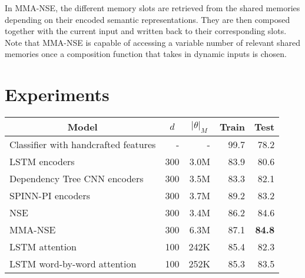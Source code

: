 \documentclass{article}
\begin{document}
In MMA-NSE, the different memory slots are retrieved from the shared memories depending on their encoded semantic representations. They are then composed together with the current input and written back to their corresponding slots. Note that MMA-NSE is capable of accessing a variable number of relevant shared memories once a composition function that takes in dynamic inputs is chosen.







\section{Experiments}

\begin{table*}[t]
\begin{center}
\small
\begin{tabular}{c|c|c|c|c}
\hline 
Model & $d$ & $|\theta|_M$ & Train	& Test \\
\hline
\multicolumn{1}{l|}{Classifier with handcrafted features \cite{bowman:15}} & \multicolumn{1}{|r|}{-} & \multicolumn{1}{|r|}{-} & \multicolumn{1}{|r|}{99.7} & \multicolumn{1}{|r}{78.2} \\
\hline
\multicolumn{1}{l|}{LSTM encoders \cite{bowman:15}} & \multicolumn{1}{|r|}{300} & \multicolumn{1}{|r|}{3.0M} & \multicolumn{1}{|r|}{83.9} & \multicolumn{1}{|r}{80.6} \\
\multicolumn{1}{l|}{Dependency Tree CNN encoders \cite{Lili16}} & \multicolumn{1}{|r|}{300} & \multicolumn{1}{|r|}{3.5M} & \multicolumn{1}{|r|}{83.3} & \multicolumn{1}{|r}{82.1} \\
\multicolumn{1}{l|}{SPINN-PI encoders \cite{BowmanGRGMP16}} & \multicolumn{1}{|r|}{300} & \multicolumn{1}{|r|}{3.7M} & \multicolumn{1}{|r|}{89.2} & \multicolumn{1}{|r}{83.2} \\
\multicolumn{1}{l|}{NSE} & \multicolumn{1}{|r|}{300} & \multicolumn{1}{|r|}{3.4M} & \multicolumn{1}{|r|}{86.2} & \multicolumn{1}{|r}{84.6} \\ \multicolumn{1}{l|}{MMA-NSE} & \multicolumn{1}{|r|}{300} & \multicolumn{1}{|r|}{6.3M} & \multicolumn{1}{|r|}{87.1} & \multicolumn{1}{|r}{\textbf{84.8}} \\ \hline
\multicolumn{1}{l|}{LSTM attention \cite{rocktaschel:16}} & \multicolumn{1}{|r|}{100} & \multicolumn{1}{|r|}{242K} & \multicolumn{1}{|r|}{85.4} & \multicolumn{1}{|r}{82.3} \\
\multicolumn{1}{l|}{LSTM word-by-word attention \cite{rocktaschel:16}} & \multicolumn{1}{|r|}{100} & \multicolumn{1}{|r|}{252K} & \multicolumn{1}{|r|}{85.3} & \multicolumn{1}{|r}{83.5} \\

\end{tabular}
\end{center}
\end{table*}
\end{document}
